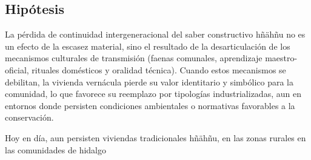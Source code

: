 \subsection{Hipótesis}

La pérdida de continuidad intergeneracional del saber constructivo hñähñu no es un efecto de la escasez material, sino el resultado de la desarticulación de los mecanismos culturales de transmisión (faenas comunales, aprendizaje maestro-oficial, rituales domésticos y oralidad técnica).  Cuando estos mecanismos se debilitan, la vivienda vernácula pierde su valor identitario y simbólico para la comunidad, lo que favorece su reemplazo por tipologías industrializadas, aun en entornos donde persisten condiciones ambientales o normativas favorables a la conservación.

Hoy en día, aun persisten viviendas tradicionales hñähñu, en las zonas rurales en las comunidades de hidalgo
